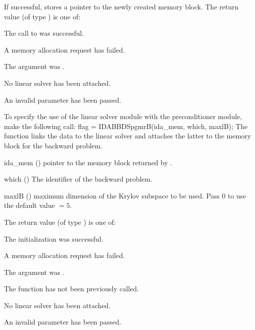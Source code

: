 {
  If successful,  stores a pointer to the newly created 
  {\idabbdpre} memory block.
  The return value  (of type ) is one of:
  \begin{args}
  \item[\Id{IDASPILS\_SUCCESS}]
    The call to  was successful.
  \item[\Id{IDASPILS\_MEM\_FAIL}]
    A memory allocation request has failed.
  \item[\Id{IDASPILS\_MEM\_NULL}]
    The  argument was .
  \item[\Id{IDASPILS\_LMEM\_NULL}]
    No linear solver has been attached.
  \item[\Id{IDASPILS\_ILL\_INPUT}]
    An invalid parameter has been passed.
  \end{args}
}
{}
To specify the use of the {\idaspgmr} linear solver module with the {\idabbdpre} 
preconditioner module, make the following call:
{
  flag = IDABBDSpgmrB(ida\_mem, which, maxlB);
}
{
  The function  links the {\idabbdpre} data to the
  {\idaspgmr} linear solver and attaches the latter to the {\idas}
  memory block for the backward problem.
}
{
  \begin{args}
  \item[ida\_mem] ()
    pointer to the {\idas} memory block returned by .
  \item[which] ()
    The identifier of the backward problem.
  \item[maxlB] ()
    maximum dimension of the Krylov subspace to be used. Pass $0$ to use the 
    default value $=5$.
  \end{args}
}
{
  The return value  (of type ) is one of:
  \begin{args}
  \item[\Id{IDASPILS\_SUCCESS}] 
    The {\idaspgmr} initialization was successful.
  \item[\Id{IDASPILS\_MEM\_FAIL}]
    A memory allocation request has failed.
  \item[\Id{IDASPILS\_MEM\_NULL}]
    The  argument was .
  \item[\Id{IDASPILS\_NO\_ADJ}]
    The function  has not been previously called.
  \item[\Id{IDASPILS\_LMEM\_NULL}]
    No linear solver has been attached.
  \item[\Id{IDASPILS\_ILL\_INPUT}]
    An invalid parameter has been passed.
  \end{args}
}
